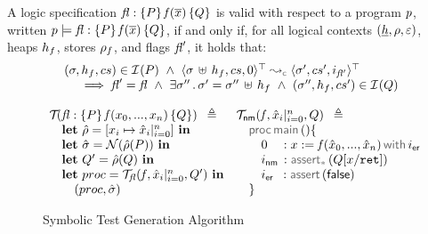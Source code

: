 \begin{definition}
A \jsil logic specification ${\mathit{fl}} : \{ P \} \, \mathit{f}(\overline{x}) \, \{ Q \}$ is valid with respect to a program 
$p$, written $p \models {\ensuremath{\mathit{fl}}} : \{ P \} \, \mathit{f}(\overline{x}) \, \{ Q \}$, if and only if, for all logical 
contexts $(\underline{h}, \rho, \varepsilon)$, heaps $h_f$, stores $\rho_f$, and flags $\mathit{fl}'$, it holds that: 
$$
\begin{array}{l}
   (\jstate, \heap_f, \cs) \in \interpret{}{}(P) 
   \ \wedge \ 
    \abssemrule{\jstate \dunion \heap_f, \cs, 0}{\jstate', \cs', i_{\flag'}}{\top}{\top}{\concrete} \\ \quad \
   \implies
      \flag' = \flag \ \wedge \ \exists \jstate'' \, . \, \jstate' = \jstate'' \dunion \heap_f
          \ \wedge \   (\jstate'', \heap_f, \cs') \in \interpret{}{}(Q) 
\end{array}
$$
\end{definition}

\begin{figure}
{\footnotesize
$$
\begin{array}{lll}
\testify{}(\specsig{P}{\pid(\jvar_0, ..., \jvar_n)}{Q}{\flag}) \ \semeq                           &  \testify{\fnormal}(\pid, \svar_i|_{i=0}^n, Q) \ \semeq \\
%
\quad  \mathbf{let} \ \sstore =  [ \jvar_i \mapsto \svar_i|_{i=0}^n] \ \mathbf{in}        &  \quad \darkmath{\sf proc} \jsilmain () \{    \\
%
\quad  \mathbf{let} \ \sstate = \normaliser(\sstore(P)) \ \mathbf{in}                               &   \qquad 0_{\phantom{\sf nm}}: \jsilcall{\jvar}{\pid}{\svar_0, ..., \svar_n}{\errlab} \\
\quad  \mathbf{let} \ Q' = \sstore(Q) \ \mathbf{in}                                                           &  \qquad \retlab \, : \sepassert(Q[\jvar/\retvar])  \\
\quad  \mathbf{let} \ \proc = \testify{\flag}(\pid, \svar_i|_{i=0}^n, Q')  \ \mathbf{in}  &    \qquad \errlab \, \, \, : \jassert(\jfalse)   \\
\qquad (\proc, \sstate)                                                                                                 &  \quad \}  
\end{array}
$$}
\vspace*{-0.4cm}
\caption{Symbolic Test Generation Algorithm~\label{fig:test:generation}}
\vspace*{-0.2cm}
\end{figure}

